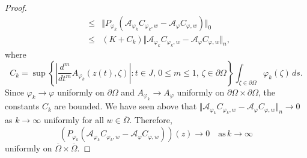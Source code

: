 \documentclass[11pt, reqno]{amsart}
\numberwithin{equation}{section}
\begin{document}
\begin{proof}
\begin{eqnarray*}
&\leq& 
\Vert P_{\varphi_k}(\mathcal{A}_{\varphi_k} C_{\varphi_k,w}-\mathcal{A}_{\varphi} C_{\varphi,w}) \Vert_0\\
&\leq& 
(K+C_k) \Vert \mathcal{A}_{\varphi_k} C_{\varphi_k,w}-\mathcal{A}_{\varphi} C_{\varphi,w}\Vert_n,
\end{eqnarray*}
where
\[
C_k=\sup\left\lbrace\left\lvert \frac{d^m}{dt^m} A_{\varphi_k}(z(t),\zeta) \right\rvert:t\in J,\,0\leq m\leq 1,\,\zeta\in\partial\Omega\right\rbrace 
\int_{\zeta\in\partial\Omega}\varphi_k(\zeta)\,ds.
\]
Since $\varphi_k\rightarrow\varphi$ uniformly on $\partial\Omega$ and $A_{\varphi_k}\rightarrow A_{\varphi}$ uniformly on $\partial\Omega\times\partial\Omega$, the constants $C_k$ are bounded. We have seen above that $\Vert \mathcal{A}_{\varphi_k} C_{\varphi_k,w}-\mathcal{A}_{\varphi} C_{\varphi,w}\Vert_n\rightarrow 0$ as $k\rightarrow\infty$ uniformly for all $w\in\overline{\Omega}$. Therefore,
\[
(P_{\varphi_k}(\mathcal{A}_{\varphi_k} C_{\varphi_k,w}-\mathcal{A}_{\varphi} C_{\varphi,w}))(z)\rightarrow 0
\quad \text{as}\,k\rightarrow\infty
\]
uniformly on $\overline{\Omega}\times\overline{\Omega}$. 

\medskip


\end{proof}
\end{document}
